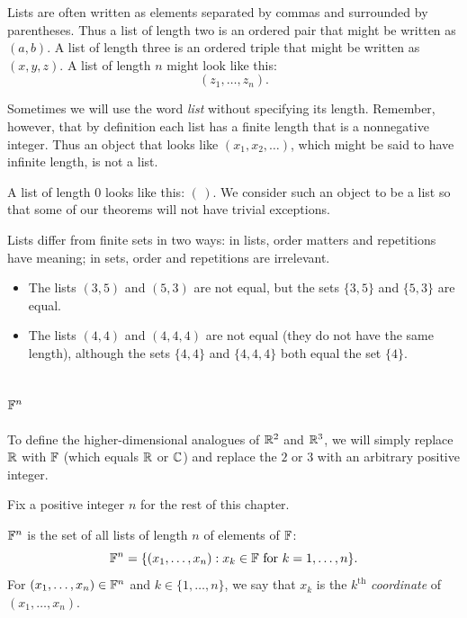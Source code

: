 %
Lists are often written as elements separated by commas and surrounded by
parentheses. Thus a list of length two is an ordered pair that might be written
as $(a,b)$. A list of length three is an ordered triple that might be written
as $(x,y,z)$. A list of length $n$ might look like this:
\[ (z_1,\dots,z_n). \]

Sometimes we will use the word \emph{list} without specifying its length.
Remember, however, that by definition each list has a finite length that is a
nonnegative integer. Thus an object that looks like $(x_1,x_2,\dots)$, which
might be said to have infinite length, is not a list.

A list of length $0$ looks like this: $(\,)$. We consider such an object to be
a list so that some of our theorems will not have trivial exceptions.

Lists differ from finite sets in two ways: in lists, order matters and
repetitions have meaning; in sets, order and repetitions are irrelevant.

\begin{example}\label{ax:1.9}\leavevmode
\begin{itemize}
\item The lists $(3,5)$ and $(5,3)$ are not equal, but the sets $\{3,5\}$ and
  $\{5,3\}$ are equal.
\item The lists $(4,4)$ and $(4,4,4)$ are not equal (they do not have the same
  length), although the sets $\{4,4\}$ and $\{4,4,4\}$ both equal the set
  $\{4\}$.
\end{itemize}
\end{example}

\subsection{\texorpdfstring{$\F^n$}{F^n}}

To define the higher-dimensional analogues of $\mathbb{R}^2$ and $\mathbb{R}^3$, we will simply
replace $\mathbb{R}$ with $\mathbb{F}$ (which equals $\mathbb{R}$ or $\mathbb{C}$) and replace the $2$ or $3$
with an arbitrary positive integer.

\begin{notation}[$n$]\label{ax:1.10}
Fix a positive integer $n$ for the rest of this chapter.
\end{notation}

\begin{definition}[$\F^n$, coordinate]\label{ax:1.11}
$\F^n$ is the set of all lists of length $n$ of elements of $\mathbb{F}$:
\[ \mathbb{F}^n = \{(x_1,\dots,x_n) : x_k\in\mathbb{F} \text{ for } k=1,\dots,n\}. \]
For $(x_1,\dots,x_n)\in\mathbb{F}^n$ and $k\in\{1,\dots,n\}$, we say that $x_k$ is the
$k^{\text{th}}$ \emph{coordinate} of $(x_1,\dots,x_n)$.
\end{definition}

